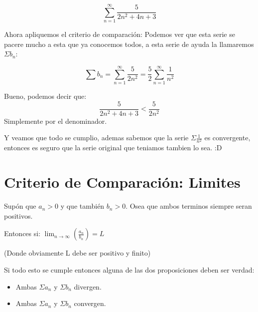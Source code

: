 \documentclass[12pt]{report}							    %
\begin{document}
        \begin{equation*}
            \sum_{n=1}^{\infty} \frac{5}{2n^2 +4n +3}
        \end{equation*}

        Ahora apliquemos el criterio de comparación: Podemos ver que esta serie se pacere mucho a esta
        que ya conocemos todos, a esta serie de ayuda la llamaremos $\Sigma b_n$:

        \begin{equation*}
            \sum b_n = \sum_{n=1}^{\infty} \frac{5}{2n^2} = \frac{5}{2}\sum_{n=1}^{\infty} \frac{1}{n^2}
        \end{equation*}

        Bueno, podemos decir que:
        \begin{equation*}
            \frac{5}{2n^2 +4n +3} < \frac{5}{2n^2}
        \end{equation*}
        Simplemente por el denominador.

        Y veamos que todo se cumplio, ademas sabemos que la serie $\Sigma \frac{1}{n^2}$ es convergente,
        entonces es seguro que la serie original que teniamos tambien lo sea. :D



    \clearpage
    \section{Criterio de Comparación: Limites}

        Supón que $a _n > 0$ y que también $b_n > 0$. Osea que ambos terminos siempre seran positivos.

        Entonces si:
        $\lim_{n \to \infty} \left( \frac{a_n}{b_n} \right) = L$

        (Donde obviamente L debe ser positivo y finito)

        Si todo esto se cumple entonces alguna de las dos proposiciones deben ser verdad:
        \begin{itemize}
            \item Ambas $\Sigma a_n$ y $\Sigma b_n$ divergen.
            \item Ambas $\Sigma a_n$ y $\Sigma b_n$ convergen.
        \end{itemize}

\end{document}
